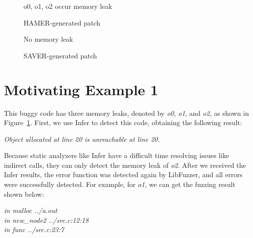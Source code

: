\documentclass[a4paper,11pt,oneside,openany]{book}
\begin{document}
\begin{figure*}
  \begin{subfigure}{0.47\textwidth}
    
    \caption{o0, o1, o2 occur memory leak}
    \label{me1a}
  \end{subfigure}\hfill
  \begin{subfigure}{0.45\textwidth}
    
    \caption{HAMER-generated patch}
    \label{me1b}
  \end{subfigure}
  \caption{Motivating Example 1: Infer false-negative alarm} 
  \label{me1}
\end{figure*}

\begin{figure*}
  \begin{subfigure}{0.47\textwidth}
    
    \caption{No memory leak}
  \end{subfigure}\hfill
  \begin{subfigure}{0.45\textwidth}
    
    \caption{SAVER-generated patch}
  \end{subfigure}
  \caption{Motivating Example 2: Infer false-positive alarm}
  \label{me2}
\end{figure*}

\section{Motivating Example 1}
This buggy code has three memory leaks, denoted by {\it o0}, {\it o1}, and {\it o2}, as shown in Figure~\ref{me1a}. First, we use Infer to detect this code, obtaining the following result:

\begin{minipage}{\textwidth}
\vspace{0.2cm}
\textsl{\hspace{0.3cm}Object allocated at line 20 is unreachable at line 20.\\}
\end{minipage}

Because static analyzers like Infer have a difficult time resolving issues like indirect calls, they can only detect the memory leak of {\it o2}. After we received the Infer results, the error function was detected again by LibFuzzer, and all errors were successfully detected. For example, for {\it o1}, we can get the fuzzing result shown below:


\begin{minipage}{\textwidth}
    \vspace{0.2cm}
    \textsl{\hspace{0.3cm}in malloc ../a.out\\\hspace{0.3cm}in new\_node2 ../src.c:12:18\\\hspace{0.3cm}in func ../src.c:23:7\\}
\end{minipage}
\end{document}
